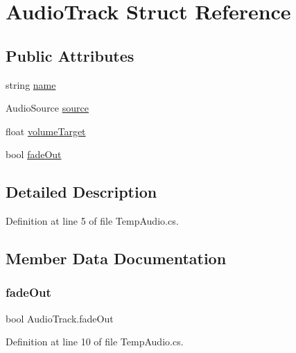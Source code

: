 \hypertarget{struct_audio_track}{}\section{Audio\+Track Struct Reference}
\label{struct_audio_track}
\subsection*{Public Attributes}
\begin{DoxyCompactItemize}
\item 
string \mbox{\hyperlink{struct_audio_track_afe7fae29241edb239bc8fd458e5dd717}{name}}
\item 
Audio\+Source \mbox{\hyperlink{struct_audio_track_a43cc6e8e9debaca8d919a0b31fb600fc}{source}}
\item 
float \mbox{\hyperlink{struct_audio_track_a41be4ab8ce93a0555b7ac292bbb75cd0}{volume\+Target}}
\item 
bool \mbox{\hyperlink{struct_audio_track_ac4cd5c46f78fab57326a53cb51044946}{fade\+Out}}
\end{DoxyCompactItemize}


\subsection{Detailed Description}


Definition at line 5 of file Temp\+Audio.\+cs.



\subsection{Member Data Documentation}
\mbox{\label{struct_audio_track_ac4cd5c46f78fab57326a53cb51044946}} 
\subsubsection{\texorpdfstring{fade\+Out}{fadeOut}}
{\footnotesize\ttfamily bool Audio\+Track.\+fade\+Out}



Definition at line 10 of file Temp\+Audio.\+cs.

\mbox{\label{struct_audio_track_afe7fae29241edb239bc8fd458e5dd717}} 
